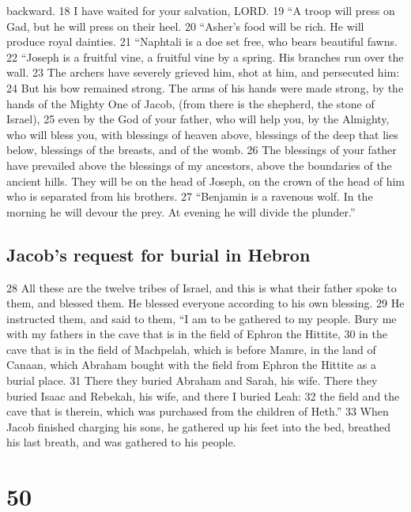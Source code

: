 backward. {18} I have waited for your salvation, LORD. {19} ``A troop
will press on Gad, but he will press on their heel. {20} ``Asher's food
will be rich. He will produce royal dainties. {21} ``Naphtali is a doe
set free, who bears beautiful fawns. {22} ``Joseph is a fruitful vine, a
fruitful vine by a spring. His branches run over the wall. {23} The
archers have severely grieved him, shot at him, and persecuted him: {24}
But his bow remained strong. The arms of his hands were made strong, by
the hands of the Mighty One of Jacob, (from there is the shepherd, the
stone of Israel), {25} even by the God of your father, who will help
you, by the Almighty, who will bless you, with blessings of heaven
above, blessings of the deep that lies below, blessings of the breasts,
and of the womb. {26} The blessings of your father have prevailed above
the blessings of my ancestors, above the boundaries of the ancient
hills. They will be on the head of Joseph, on the crown of the head of
him who is separated from his brothers. {27} ``Benjamin is a ravenous
wolf. In the morning he will devour the prey. At evening he will divide
the plunder.''

\hypertarget{jacobs-request-for-burial-in-hebron}{%
\subsection{Jacob's request for burial in
Hebron}\label{jacobs-request-for-burial-in-hebron}}

{28} All these are the twelve tribes of Israel, and this is what their
father spoke to them, and blessed them. He blessed everyone according to
his own blessing. {29} He instructed them, and said to them, ``I am to
be gathered to my people. Bury me with my fathers in the cave that is in
the field of Ephron the Hittite, {30} in the cave that is in the field
of Machpelah, which is before Mamre, in the land of Canaan, which
Abraham bought with the field from Ephron the Hittite as a burial place.
{31} There they buried Abraham and Sarah, his wife. There they buried
Isaac and Rebekah, his wife, and there I buried Leah: {32} the field and
the cave that is therein, which was purchased from the children of
Heth.'' {33} When Jacob finished charging his sons, he gathered up his
feet into the bed, breathed his last breath, and was gathered to his
people.

\hypertarget{section-49}{%
\section{50}\label{section-49}}


